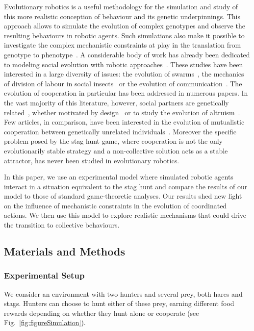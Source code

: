     Evolutionary robotics is a useful methodology for the simulation and study of this more realistic conception of behaviour and its genetic underpinnings\parencite{Nolfi2004, Doncieux2015}. This approach allows to simulate the evolution of complex genotypes and observe the resulting behaviours in robotic agents. Such simulations also make it possible to investigate the complex mechanistic constraints at play in the translation from genotype to phenotype~\parencite{Mitri2012}. A considerable body of work has already been dedicated to modeling social evolution with robotic approaches~\parencite{Trianni2014}. These studies have been interested in a large diversity of issues: the evolution of swarms~\parencite{Olson2013}, the mechanics of division of labour in social insects~\parencite{Tarapore2010, Ferrante2015} or the evolution of communication~\parencite{Floreano2007, Mitri2011, Wischmann2012, Solomon2012}. The evolution of cooperation in particular has been addressed in numerous papers. In the vast majority of this literature, however, social partners are genetically related~\parencite{Waibel2009}, whether motivated by design~\parencite{Hauert2010, Trianni2007} or to study the evolution of altruism~\parencite{Waibel2011, Montanier2013}. Few articles, in comparison, have been interested in the evolution of mutualistic cooperation between genetically unrelated individuals~\parencite{Solomon2012}. Moreover the specific problem posed by the stag hunt game, where cooperation is not the only evolutionarily stable strategy and a non-collective solution acts as a stable attractor, has never been studied in evolutionary robotics.

    In this paper, we use an experimental model where simulated robotic agents interact in a situation equivalent to the stag hunt and compare the results of our model to those of standard game-theoretic analyses. Our results shed new light on the influence of mechanistic constraints in the evolution of coordinated actions. We then use this model to explore realistic mechanisms that could drive the transition to collective behaviours.

  \subsection{Materials and Methods}
  \label{sec:methods}
    \subsubsection{Experimental Setup}
    \label{setup}
      We consider an environment with two hunters and several prey, both hares and stags. Hunters can choose to hunt either of these prey, earning different food rewards depending on whether they hunt alone or cooperate (see Fig.~\ref{fig:figureSimulation}).

